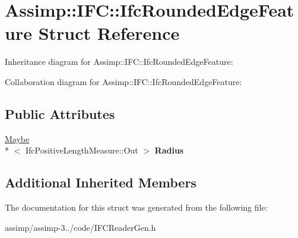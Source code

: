 \hypertarget{struct_assimp_1_1_i_f_c_1_1_ifc_rounded_edge_feature}{\section{Assimp\+:\+:I\+F\+C\+:\+:Ifc\+Rounded\+Edge\+Feature Struct Reference}
\label{struct_assimp_1_1_i_f_c_1_1_ifc_rounded_edge_feature}
}


Inheritance diagram for Assimp\+:\+:I\+F\+C\+:\+:Ifc\+Rounded\+Edge\+Feature\+:


Collaboration diagram for Assimp\+:\+:I\+F\+C\+:\+:Ifc\+Rounded\+Edge\+Feature\+:
\subsection*{Public Attributes}
\begin{DoxyCompactItemize}
\item 
\hypertarget{struct_assimp_1_1_i_f_c_1_1_ifc_rounded_edge_feature_a91e862d32b6ac989feca371b07af66bb}{\hyperlink{struct_assimp_1_1_s_t_e_p_1_1_maybe}{Maybe}\\*
$<$ Ifc\+Positive\+Length\+Measure\+::\+Out $>$ {\bfseries Radius}}\label{struct_assimp_1_1_i_f_c_1_1_ifc_rounded_edge_feature_a91e862d32b6ac989feca371b07af66bb}

\end{DoxyCompactItemize}
\subsection*{Additional Inherited Members}


The documentation for this struct was generated from the following file\+:\begin{DoxyCompactItemize}
\item 
assimp/assimp-\/3../code/I\+F\+C\+Reader\+Gen.\+h\end{DoxyCompactItemize}
